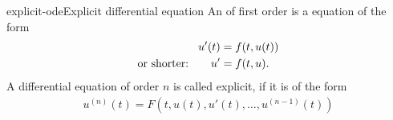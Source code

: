 \begin{Definition}{explicit-ode}{Explicit differential equation}
   An  of first order is a equation of the form
  \begin{align}
    \label{eq:awa:ode}
    u'(t) &= f(t,u(t))\\
    \text{or shorter:}\qquad u'&=f(t,u). \notag
  \end{align}
  A differential equation of order $n$ is called explicit, if it is of
  the form
  \begin{gather*}
    u^{(n)}(t) = F\left(t, u(t), u'(t), \ldots, u^{(n-1)}(t)\right)
  \end{gather*}
\end{Definition}